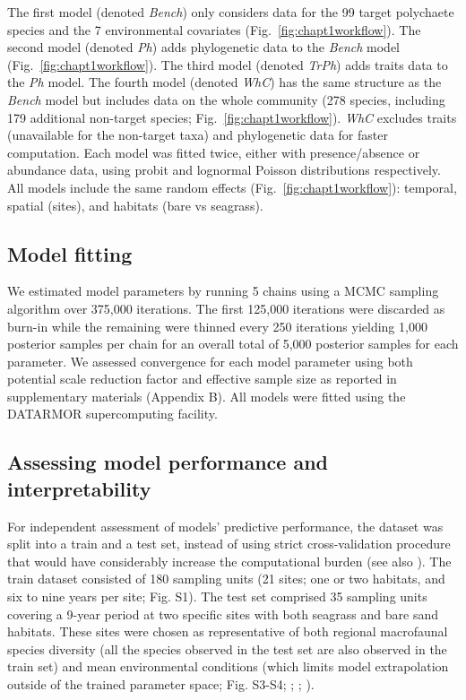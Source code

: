 \begin{refsection}
The first model (denoted \emph{Bench}) only considers data for the 99
target polychaete species and the 7 environmental covariates
(Fig.~\ref{fig:chapt1workflow}). The second model (denoted \emph{Ph})
adds phylogenetic data to the \emph{Bench} model
(Fig.~\ref{fig:chapt1workflow}). The third model (denoted \emph{TrPh})
adds traits data to the \emph{Ph} model. The fourth model (denoted
\emph{WhC}) has the same structure as the \emph{Bench} model but
includes data on the whole community (278 species, including 179
additional non-target species; Fig.~\ref{fig:chapt1workflow}).
\emph{WhC} excludes traits (unavailable for the non-target taxa) and
phylogenetic data for faster computation. Each model was fitted twice,
either with presence/absence or abundance data, using probit and
lognormal Poisson distributions respectively. All models include the
same random effects (Fig.~\ref{fig:chapt1workflow}): temporal, spatial
(sites), and habitats (bare vs seagrass).

\hypertarget{model-fitting}{%
\subsection{Model fitting}\label{model-fitting}}

We estimated model parameters by running 5 chains using a MCMC sampling
algorithm over 375,000 iterations. The first 125,000 iterations were
discarded as burn-in while the remaining were thinned every 250
iterations yielding 1,000 posterior samples per chain for an overall
total of 5,000 posterior samples for each parameter. We assessed
convergence for each model parameter using both potential scale
reduction factor \autocite{Gelman_1992} and effective sample size as
reported in supplementary materials (Appendix B). All models were fitted
using the DATARMOR supercomputing facility.

\hypertarget{assessing-model-performance-and-interpretability}{%
\subsection{Assessing model performance and
interpretability}\label{assessing-model-performance-and-interpretability}}

For independent assessment of models' predictive performance, the
dataset was split into a train and a test set, instead of using strict
cross-validation procedure that would have considerably increase the
computational burden (see also \textcite{Norberg_2019}). The train
dataset consisted of 180 sampling units (21 sites; one or two habitats,
and six to nine years per site; Fig. S1). The test set comprised 35
sampling units covering a 9-year period at two specific sites with both
seagrass and bare sand habitats. These sites were chosen as
representative of both regional macrofaunal species diversity (all the
species observed in the test set are also observed in the train set) and
mean environmental conditions (which limits model extrapolation outside
of the trained parameter space; Fig. S3-S4; \textcite{Boye_2017} ;
\textcite{Boye_2022} ; \textcite{Toumi_2023}).


\end{refsection}
